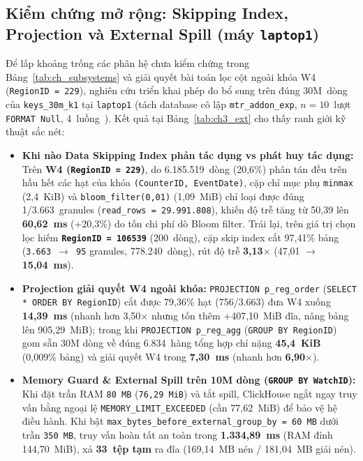 \documentclass[13pt,a4paper]{report}
\begin{document}
\subsection{Kiểm chứng mở rộng: Skipping Index, Projection và External Spill (máy \texttt{laptop1})}
Để lấp khoảng trống các phân hệ chưa kiểm chứng trong Bảng~\ref{tab:ch_subsystems} và giải quyết bài toán lọc cột ngoài khóa W4 (\texttt{RegionID = 229}), nghiên cứu triển khai phép đo bổ sung trên đúng 30M~dòng của \texttt{keys\_\allowbreak{}30m\_\allowbreak{}k1} tại \texttt{laptop1} (tách database cô lập \texttt{mtr\_\allowbreak{}addon\_\allowbreak{}exp}, $n = 10$~lượt \texttt{FORMAT Null}, 4~luồng~\cite{M6}). Kết quả tại Bảng~\ref{tab:ch3_ext} cho thấy ranh giới kỹ thuật sắc nét:
\begin{itemize}
    \setlength{\itemsep}{2pt}\setlength{\parskip}{0pt}
    \item \textbf{Khi nào Data Skipping Index phản tác dụng vs phát huy tác dụng:} Trên \textbf{W4 (\texttt{RegionID = 229})}, do 6.185.519~dòng (20,6\%) phân tán đều trên hầu hết các hạt của khóa \texttt{(\allowbreak{}CounterID, EventDate)}, cặp chỉ mục phụ \texttt{minmax} (2,4~KiB) và \texttt{bloom\_\allowbreak{}filter(0,01)} (1,09~MiB) chỉ loại được đúng 1/3.663~granules (\texttt{read\_\allowbreak{}rows = 29.991.808}), khiến độ trễ tăng từ 50,39 lên \textbf{60,62~ms} (+20,3\%) do tốn chi phí dò Bloom filter. Trái lại, trên giá trị chọn lọc hiếm \textbf{\texttt{RegionID = 106539}} (200~dòng), cặp skip index cắt 97,41\% bảng (\texttt{3.663 $\rightarrow$ 95} granules, 778.240~dòng), rút độ trễ \textbf{3,13${\times}$} (47,01 $\rightarrow$ \textbf{15,04~ms}).
    \item \textbf{Projection giải quyết W4 ngoài khóa:} \texttt{PROJECTION p\_\allowbreak{}reg\_\allowbreak{}order} (\texttt{SELECT * ORDER BY RegionID}) cắt được 79,36\% hạt (756/3.663) đưa W4 xuống \textbf{14,39~ms} (nhanh hơn 3,50${\times}$ nhưng tốn thêm +407,10~MiB đĩa, nâng bảng lên 905,29~MiB); trong khi \texttt{PROJECTION p\_\allowbreak{}reg\_\allowbreak{}agg} (\texttt{GROUP BY RegionID}) gom sẵn 30M dòng về đúng 6.834~hàng tổng hợp chỉ nặng \textbf{45,4~KiB} (0,009\% bảng) và giải quyết W4 trong \textbf{7,30~ms} (nhanh hơn \textbf{6,90${\times}$}).
    \item \textbf{Memory Guard \& External Spill trên 10M dòng (\texttt{GROUP BY WatchID}):} Khi đặt trần RAM \texttt{80~MB} (\texttt{76,29~MiB}) và tắt spill, ClickHouse ngắt ngay truy vấn bằng ngoại lệ \texttt{MEMORY\_\allowbreak{}LIMIT\_\allowbreak{}EXCEEDED} (cần 77,62~MiB) để bảo vệ hệ điều hành. Khi bật \texttt{max\_\allowbreak{}bytes\_\allowbreak{}before\_\allowbreak{}external\_\allowbreak{}group\_\allowbreak{}by = 60~MB} dưới trần \texttt{350~MB}, truy vấn hoàn tất an toàn trong \textbf{1.334,89~ms} (RAM đỉnh 144,70~MiB), xả \textbf{33~tệp tạm} ra đĩa (169,14~MB nén / 181,04~MB giải nén).
\end{itemize}
\end{document}
